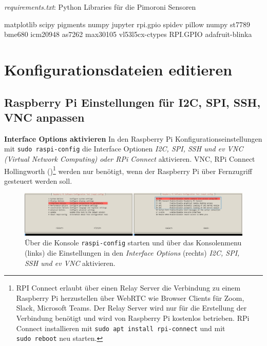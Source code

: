 \documentclass[
  11pt,
  a4paperpaper,
  oneside, openany  ,captions=tableheading
]{scrbook}
\newenvironment{Shaded}{\begin{snugshade}}{\end{snugshade}}
\newcommand{\NormalTok}[1]{\textcolor[rgb]{0.00,0.23,0.31}{#1}}
\theoremstyle{definition}
\theoremstyle{remark}
\begin{document}
\emph{requirements.txt}: Python Libraries für die Pimoroni Sensoren

\begin{Shaded}
\begin{Highlighting}[]
\NormalTok{matplotlib}
\NormalTok{scipy}
\NormalTok{pigments}
\NormalTok{numpy}
\NormalTok{jupyter}
\NormalTok{rpi.gpio}
\NormalTok{spidev}
\NormalTok{pillow}
\NormalTok{numpy}
\NormalTok{st7789}
\NormalTok{bme680}
\NormalTok{icm20948}
\NormalTok{as7262}
\NormalTok{max30105}
\NormalTok{vl53l5cx{-}ctypes}
\NormalTok{RPI.GPIO}
\NormalTok{adafruit{-}blinka}
\end{Highlighting}
\end{Shaded}

\section{Konfigurationsdateien
editieren}\label{konfigurationsdateien-editieren}

\subsection{Raspberry Pi Einstellungen für I2C, SPI, SSH, VNC
anpassen}\label{raspberry-pi-einstellungen-fuxfcr-i2c-spi-ssh-vnc-anpassen}

\textbf{Interface Options aktivieren} In den Raspberry Pi
Konfigurationseinstellungen mit \texttt{sudo\ raspi-config} die
Interface Optionen \emph{I2C, SPI, SSH und ev VNC (Virtual Network
Computing) oder RPi Connect} aktivieren. VNC, RPi Connect Hollingworth
()\footnote{RPI Connect erlaubt
  über einen Relay Server die Verbindung zu einem Raspberry Pi
  herzustellen über WebRTC wie Browser Clients für Zoom, Slack,
  Microsoft Teams. Der Relay Server wird nur für die Erstellung der
  Verbindung benötigt und wird von Raspberry Pi kostenlos betrieben. RPi
  Connect installieren mit \texttt{sudo\ apt\ install\ rpi-connect} und
  mit \texttt{sudo\ reboot} neu starten.} werden nur benötigt, wenn der
Raspberry Pi über Fernzugriff gesteuert werden soll.

\begin{figure}[H]

{\centering \includegraphics{images/raspberry_pi_enable_ssh_spi_i2c.png}

}

\caption{Über die Konsole \texttt{raspi-config} starten und über das
Konsolenmenu (links) die Einstellungen in den \emph{Interface Options}
(rechts) \emph{I2C, SPI, SSH und ev VNC} aktivieren.}

\end{figure}%
\end{document}
